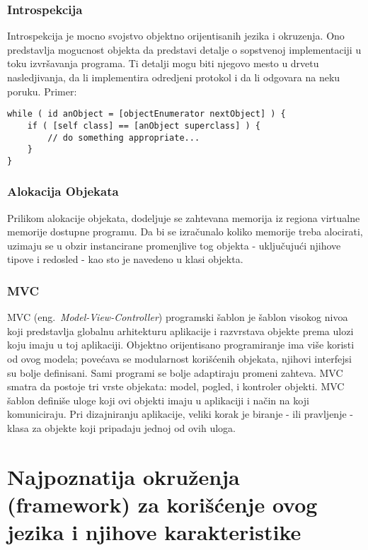 \documentclass[a4paper]{article}
\begin{document}
\subsubsection{Introspekcija}
Introspekcija je mocno svojstvo objektno orijentisanih jezika i okruzenja. Ono predstavlja mogucnost objekta da predstavi detalje o sopstvenoj implementaciji u toku izvršavanja programa. Ti detalji mogu biti njegovo mesto u drvetu nasledjivanja, da li implementira odredjeni protokol i da li odgovara na neku poruku. Primer: 
\begin{lstlisting}[frame=single]
while ( id anObject = [objectEnumerator nextObject] ) {
    if ( [self class] == [anObject superclass] ) {
        // do something appropriate...
    }
}
\end{lstlisting}
\subsubsection{Alokacija Objekata}
Prilikom alokacije objekata, dodeljuje se zahtevana memorija iz regiona virtualne memorije dostupne programu. Da bi se izračunalo koliko memorije treba alocirati, uzimaju se u obzir instancirane promenjlive tog objekta - uključujući njihove tipove i redosled - kao sto je navedeno u klasi objekta.

\subsubsection{MVC}
MVC (eng.~{\em Model-View-Controller}) programski šablon je šablon visokog nivoa koji predstavlja globalnu arhitekturu aplikacije i razvrstava objekte prema ulozi koju imaju u toj aplikaciji.
Objektno orijentisano programiranje ima više koristi od ovog modela; povećava se modularnost korišćenih objekata, njihovi interfejsi su bolje definisani. Sami programi se bolje adaptiraju promeni zahteva.
MVC smatra da postoje tri vrste objekata: model, pogled, i kontroler objekti. MVC šablon definiše uloge koji ovi objekti imaju u aplikaciji i način na koji komuniciraju. Pri dizajniranju aplikacije, veliki korak je biranje - ili pravljenje - klasa za objekte koji pripadaju jednoj od ovih uloga. 

\section{Najpoznatija okruženja (framework) za korišćenje ovog jezika i njihove karakteristike}
\label{sec:okruzenja}
\end{document}

